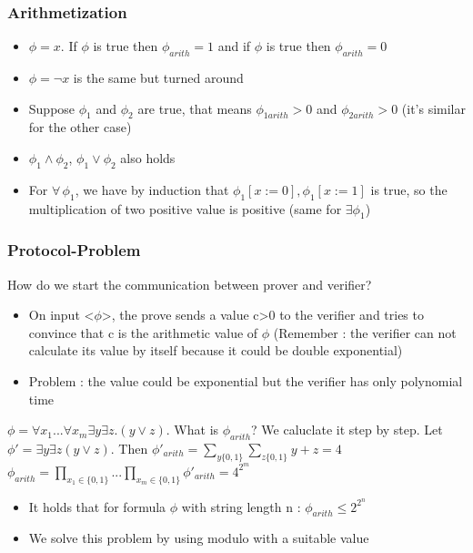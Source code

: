 \documentclass[hyperref={pdfpagelabels=false},t,10pt]{beamer}
\begin{document}
\begin{frame}
  \frametitle{Arithmetization}
  \begin{itemize}
    \item $\phi = x$. If $\phi$ is true then $\phi_{arith} = 1$ and if $\phi $ is true then $\phi_{arith} = 0$
    \item $\phi = \neg x$ is the same but turned around \pause
    \item Suppose $\phi_1$ and $\phi_2$ are true, that means $\phi_{1arith} > 0$ and $\phi_{2arith} > 0$ \newline(it's similar for the other case)\pause
    \item $\phi_1 \land \phi_2$, $\phi_1 \lor \phi_2$ also holds
    \item For $\forall \, \phi_1$, we have by induction that $\phi_1[x := 0], \phi_1[x := 1]$ is true, so the multiplication of two positive value is positive (same for $\exists \phi_1$)
  \end{itemize}
\end{frame}

\begin{frame}
  \frametitle{Protocol-Problem}
  How do we start the communication between prover and verifier? \pause

  \begin{itemize}
    \item On input <$\phi$>, the prove sends a value c>0 to the verifier and tries to convince that c is the arithmetic value of $\phi$ \newline (Remember : the verifier can not calculate its value by itself because it could be double exponential) \pause
    \item Problem : the value could be exponential but the verifier has only polynomial time \pause
  \end{itemize}

  $\phi = \forall x_1 ... \forall x_m \exists y \exists z. (y \lor z)$. What is $\phi_{arith}$? We caluclate it step by step. \pause
  Let $\phi' = \exists y \exists z (y \lor z)$. Then $\phi'_{arith} = \sum_{y \{0,1\}}^{} \sum_{z \{0,1\}^{}} y + z = 4$ \pause
  $\phi_{arith} = \prod_{x_1 \in \{0,1\}}^{}... \prod_{x_m \in \{0,1\}}^{} \phi'_{arith} = 4^{2^{m}}$ \newline
  \begin{itemize}
    \item It holds that for formula $\phi$ with string length n : $\phi_{arith} \leq 2^{2^{n}}$
    \item  We solve this problem by using modulo with a suitable value
  \end{itemize}
\end{frame}
\end{document}
